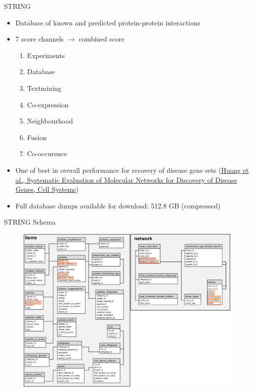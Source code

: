 \documentclass{beamer}
\begin{document}
\begin{frame}{STRING}
    \begin{itemize}
        \item Database of known and predicted protein-protein interactions
        \vfill
        \item 7 score channels $ \rightarrow $ combined score
        \begin{enumerate}
            \item Experiments
            \item Database
            \item Textmining
            \item Co-expression
            \item Neighbourhood
            \item Fusion
            \item Co-occurence
        \end{enumerate}
        \vfill
        \item One of best in overall performance for recovery of disease gene sets (\href{https://www.ncbi.nlm.nih.gov/pubmed/29605183}{Huang et al., Systematic Evaluation of Molecular Networks for Discovery of Disease Genes, Cell Systems})
        \vfill
        \item Full database dumps available for download: 512.8 GB (compressed)
    \end{itemize}
\end{frame}

\begin{frame}{STRING Schema}
% 

\begin{figure}
    \centering
    \includegraphics[width=\linewidth]{string-tables.png}
\end{figure}
\end{frame}
\end{document}
